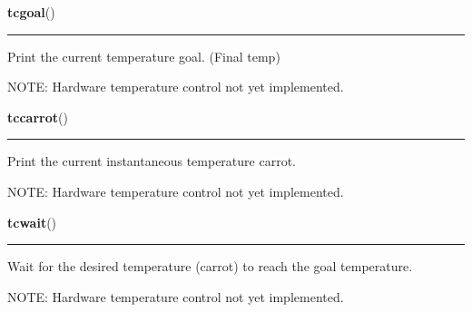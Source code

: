    \label{pydsp:tcgoal}

    \vspace{0.5ex}

    \begin{boxedminipage}{\textwidth}

    \raggedright \textbf{tcgoal}()

    \vspace{-1.5ex}

    \rule{\textwidth}{0.5\fboxrule}
    Print the current temperature goal. (Final temp)

    NOTE: Hardware temperature control not yet implemented.

    \vspace{1ex}

    \end{boxedminipage}

    \label{pydsp:tccarrot}

    \vspace{0.5ex}

    \begin{boxedminipage}{\textwidth}

    \raggedright \textbf{tccarrot}()

    \vspace{-1.5ex}

    \rule{\textwidth}{0.5\fboxrule}
    Print the current instantaneous temperature carrot.

    NOTE: Hardware temperature control not yet implemented.

    \vspace{1ex}

    \end{boxedminipage}

    \label{pydsp:tcwait}

    \vspace{0.5ex}

    \begin{boxedminipage}{\textwidth}

    \raggedright \textbf{tcwait}()

    \vspace{-1.5ex}

    \rule{\textwidth}{0.5\fboxrule}
    Wait for the desired temperature (carrot) to reach the goal 
    temperature.

    NOTE: Hardware temperature control not yet implemented.

    \vspace{1ex}

    \end{boxedminipage}

